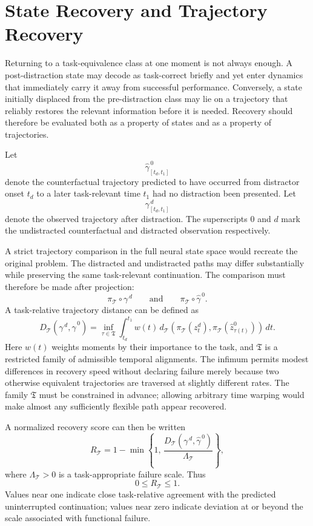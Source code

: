 \documentclass[11pt]{book}
\begin{document}
\section*{State Recovery and Trajectory Recovery}

Returning to a task-equivalence class at one moment is not always enough. A post-distraction state may decode as task-correct briefly and yet enter dynamics that immediately carry it away from successful performance. Conversely, a state initially displaced from the pre-distraction class may lie on a trajectory that reliably restores the relevant information before it is needed. Recovery should therefore be evaluated both as a property of states and as a property of trajectories.

Let
\[
\widehat{\gamma}^{\,0}_{[t_d,t_1]}
\]
denote the counterfactual trajectory predicted to have occurred from distractor onset $t_d$ to a later task-relevant time $t_1$ had no distraction been presented. Let
\[
\gamma^{\,d}_{[t_d,t_1]}
\]
denote the observed trajectory after distraction. The superscripts $0$ and $d$ mark the undistracted counterfactual and distracted observation respectively.

A strict trajectory comparison in the full neural state space would recreate the original problem. The distracted and undistracted paths may differ substantially while preserving the same task-relevant continuation. The comparison must therefore be made after projection:
\[
\pi_{\mathcal T}\circ\gamma^{\,d}
\qquad\text{and}\qquad
\pi_{\mathcal T}\circ\widehat{\gamma}^{\,0}.
\]
A task-relative trajectory distance can be defined as
\[
D_{\mathcal T}
\!\left(
\gamma^{\,d},
\widehat{\gamma}^{\,0}
\right)
=
\inf_{\tau\in\mathfrak T}
\int_{t_d}^{t_1}
w(t)\,
d_{\mathcal T}\!\left(
\pi_{\mathcal T}(z_t^{d}),
\pi_{\mathcal T}(\widehat z_{\tau(t)}^{0})
\right)\,dt.
\]
Here $w(t)$ weights moments by their importance to the task, and $\mathfrak T$ is a restricted family of admissible temporal alignments. The infimum permits modest differences in recovery speed without declaring failure merely because two otherwise equivalent trajectories are traversed at slightly different rates. The family $\mathfrak T$ must be constrained in advance; allowing arbitrary time warping would make almost any sufficiently flexible path appear recovered.

A normalized recovery score can then be written
\[
R_{\mathcal T}
=
1-
\min\left\{
1,\,
\frac{
D_{\mathcal T}
\!\left(
\gamma^{\,d},
\widehat{\gamma}^{\,0}
\right)
}{
\Lambda_{\mathcal T}
}
\right\},
\]
where $\Lambda_{\mathcal T}>0$ is a task-appropriate failure scale. Thus
\[
0\leq R_{\mathcal T}\leq 1.
\]
Values near one indicate close task-relative agreement with the predicted uninterrupted continuation; values near zero indicate deviation at or beyond the scale associated with functional failure.
\end{document}
